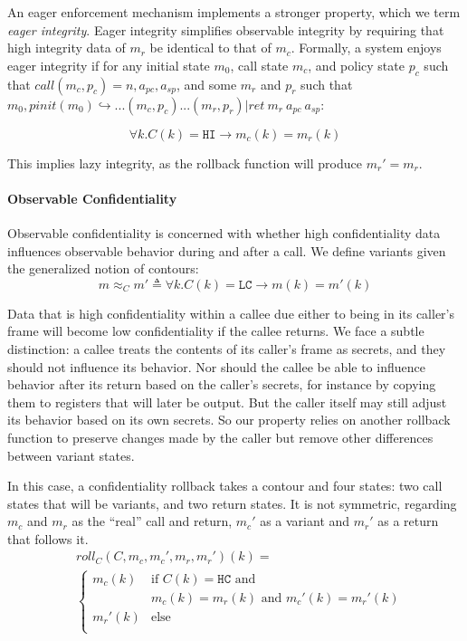 \documentclass[conference]{IEEEtran}
\begin{document}
      An eager enforcement mechanism implements a stronger property, which we term {\it eager integrity}.
      Eager integrity simplifies observable integrity by requiring that high integrity data of \(m_r\) be
      identical to that of \(m_c\). Formally, a system enjoys eager integrity if for any initial state
      \(m_0\), call state \(m_c\), and policy state \(p_c\) such that \(\mathit{call}(m_c,p_c) =
      n, a_{pc}, a_{sp}\), and some \(m_r\) and \(p_r\) such that
      \(m_0,\mathit{pinit}(m_0) \hookrightarrow ... (m_c,p_c) ... (m_r,p_r) | \mathit{ret}\ m_r\ a_{pc}\ a_{sp}\):

      \[\forall k . C(k) = \mathtt{HI} \rightarrow m_c(k) = m_r(k)\]

      This implies lazy integrity, as the rollback function will produce \(m_r' = m_r\).
 
    \paragraph{Observable Confidentiality}

      Observable confidentiality is concerned with whether high confidentiality data influences
      observable behavior during and after a call. We define variants given the generalized notion
      of contours:
      \[m \approx_C m' \triangleq \forall k . C(k) = \mathtt{LC} \rightarrow m(k) = m'(k)\]

      Data that is high confidentiality within a callee due either to being in its caller's frame
      will become low confidentiality if the callee returns. We face a subtle distinction: 
      a callee treats the contents of its caller's frame as secrets, and they should not influence
      its behavior. Nor should the callee be able to influence behavior after its return based
      on the caller's secrets, for instance by copying them to registers that will later be output.
      But the caller itself may still adjust its behavior based on its own secrets. So our property
      relies on another rollback function to preserve changes made by the caller but remove other
      differences between variant states.

      In this case, a confidentiality rollback takes a contour and four states: two call states
      that will be variants, and two return states. It is not symmetric, regarding \(m_c\) and \(m_r\)
      as the ``real'' call and return, \(m_c'\) as a variant and \(m_r'\) as a return that follows it.
      \[\begin{split}
        & \mathit{roll}_C(C,m_c,m_c',m_r,m_r')(k) = \\
        & \begin{cases}
          m_c(k) & \text{if } C(k) = \mathtt{HC} \text{ and } \\
                  & m_c(k) = m_r(k) \text{ and } m_c'(k) = m_r'(k) \\
          m_r'(k) & \text{else} \\
        \end{cases}
      \end{split}\]
\end{document}
